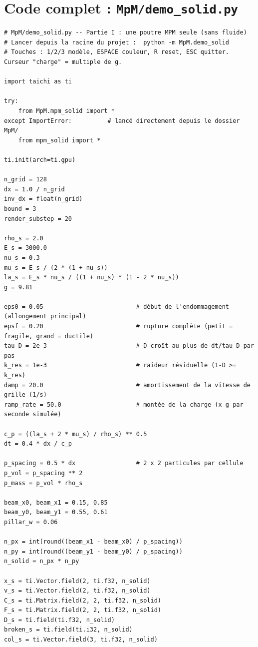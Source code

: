 \documentclass[11pt,a4paper]{article}
\begin{document}
\section{Code complet : \texttt{MpM/demo\_solid.py}}
\label{app:demo}

\begin{lstlisting}
# MpM/demo_solid.py -- Partie I : une poutre MPM seule (sans fluide)
# Lancer depuis la racine du projet :  python -m MpM.demo_solid
# Touches : 1/2/3 modèle, ESPACE couleur, R reset, ESC quitter. Curseur "charge" = multiple de g.

import taichi as ti

try:
    from MpM.mpm_solid import *
except ImportError:          # lancé directement depuis le dossier MpM/
    from mpm_solid import *

ti.init(arch=ti.gpu)

n_grid = 128
dx = 1.0 / n_grid
inv_dx = float(n_grid)
bound = 3
render_substep = 20

rho_s = 2.0
E_s = 3000.0
nu_s = 0.3
mu_s = E_s / (2 * (1 + nu_s))
la_s = E_s * nu_s / ((1 + nu_s) * (1 - 2 * nu_s))
g = 9.81

eps0 = 0.05                          # début de l'endommagement (allongement principal)
epsf = 0.20                          # rupture complète (petit = fragile, grand = ductile)
tau_D = 2e-3                         # D croît au plus de dt/tau_D par pas
k_res = 1e-3                         # raideur résiduelle (1-D >= k_res)
damp = 20.0                          # amortissement de la vitesse de grille (1/s)
ramp_rate = 50.0                     # montée de la charge (x g par seconde simulée)

c_p = ((la_s + 2 * mu_s) / rho_s) ** 0.5
dt = 0.4 * dx / c_p

p_spacing = 0.5 * dx                 # 2 x 2 particules par cellule
p_vol = p_spacing ** 2
p_mass = p_vol * rho_s

beam_x0, beam_x1 = 0.15, 0.85
beam_y0, beam_y1 = 0.55, 0.61
pillar_w = 0.06

n_px = int(round((beam_x1 - beam_x0) / p_spacing))
n_py = int(round((beam_y1 - beam_y0) / p_spacing))
n_solid = n_px * n_py

x_s = ti.Vector.field(2, ti.f32, n_solid)
v_s = ti.Vector.field(2, ti.f32, n_solid)
C_s = ti.Matrix.field(2, 2, ti.f32, n_solid)
F_s = ti.Matrix.field(2, 2, ti.f32, n_solid)
D_s = ti.field(ti.f32, n_solid)
broken_s = ti.field(ti.i32, n_solid)
col_s = ti.Vector.field(3, ti.f32, n_solid)


\end{lstlisting}
\end{document}
